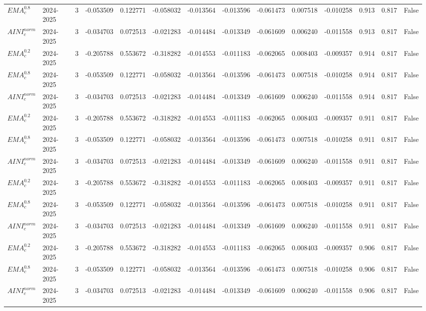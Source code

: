 \begin{tabular}{@{}llrrrrrrrrrlll@{}}
$EMA^{0.8}_{c}$ & 2024-2025 & 3 & -0.053509 & 0.122771 & -0.058032 & -0.013564 & -0.013596 & -0.061473 & 0.007518 & -0.010258 & 0.913 & 0.817 & False \\
$AINI^{norm}_{c}$ & 2024-2025 & 3 & -0.034703 & 0.072513 & -0.021283 & -0.014484 & -0.013349 & -0.061609 & 0.006240 & -0.011558 & 0.913 & 0.817 & False \\
$EMA^{0.2}_{c}$ & 2024-2025 & 3 & -0.205788 & 0.553672 & -0.318282 & -0.014553 & -0.011183 & -0.062065 & 0.008403 & -0.009357 & 0.914 & 0.817 & False \\
$EMA^{0.8}_{c}$ & 2024-2025 & 3 & -0.053509 & 0.122771 & -0.058032 & -0.013564 & -0.013596 & -0.061473 & 0.007518 & -0.010258 & 0.914 & 0.817 & False \\
$AINI^{norm}_{c}$ & 2024-2025 & 3 & -0.034703 & 0.072513 & -0.021283 & -0.014484 & -0.013349 & -0.061609 & 0.006240 & -0.011558 & 0.914 & 0.817 & False \\
$EMA^{0.2}_{c}$ & 2024-2025 & 3 & -0.205788 & 0.553672 & -0.318282 & -0.014553 & -0.011183 & -0.062065 & 0.008403 & -0.009357 & 0.911 & 0.817 & False \\
$EMA^{0.8}_{c}$ & 2024-2025 & 3 & -0.053509 & 0.122771 & -0.058032 & -0.013564 & -0.013596 & -0.061473 & 0.007518 & -0.010258 & 0.911 & 0.817 & False \\
$AINI^{norm}_{c}$ & 2024-2025 & 3 & -0.034703 & 0.072513 & -0.021283 & -0.014484 & -0.013349 & -0.061609 & 0.006240 & -0.011558 & 0.911 & 0.817 & False \\
$EMA^{0.2}_{c}$ & 2024-2025 & 3 & -0.205788 & 0.553672 & -0.318282 & -0.014553 & -0.011183 & -0.062065 & 0.008403 & -0.009357 & 0.911 & 0.817 & False \\
$EMA^{0.8}_{c}$ & 2024-2025 & 3 & -0.053509 & 0.122771 & -0.058032 & -0.013564 & -0.013596 & -0.061473 & 0.007518 & -0.010258 & 0.911 & 0.817 & False \\
$AINI^{norm}_{c}$ & 2024-2025 & 3 & -0.034703 & 0.072513 & -0.021283 & -0.014484 & -0.013349 & -0.061609 & 0.006240 & -0.011558 & 0.911 & 0.817 & False \\
$EMA^{0.2}_{c}$ & 2024-2025 & 3 & -0.205788 & 0.553672 & -0.318282 & -0.014553 & -0.011183 & -0.062065 & 0.008403 & -0.009357 & 0.906 & 0.817 & False \\
$EMA^{0.8}_{c}$ & 2024-2025 & 3 & -0.053509 & 0.122771 & -0.058032 & -0.013564 & -0.013596 & -0.061473 & 0.007518 & -0.010258 & 0.906 & 0.817 & False \\
$AINI^{norm}_{c}$ & 2024-2025 & 3 & -0.034703 & 0.072513 & -0.021283 & -0.014484 & -0.013349 & -0.061609 & 0.006240 & -0.011558 & 0.906 & 0.817 & False \\

\end{tabular}
